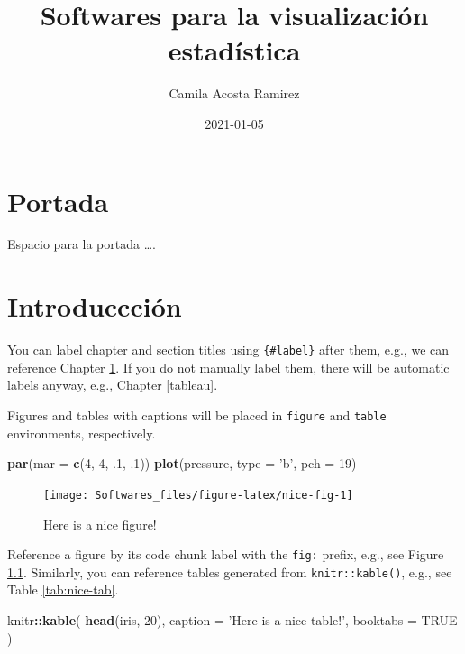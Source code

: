 \documentclass[
]{book}
\title{Softwares para la visualización estadística}
\author{Camila Acosta Ramirez}
\date{2021-01-05}
\newenvironment{Shaded}{\begin{snugshade}}{\end{snugshade}}
\newcommand{\DataTypeTok}[1]{\textcolor[rgb]{0.13,0.29,0.53}{#1}}
\newcommand{\DecValTok}[1]{\textcolor[rgb]{0.00,0.00,0.81}{#1}}
\newcommand{\FloatTok}[1]{\textcolor[rgb]{0.00,0.00,0.81}{#1}}
\newcommand{\KeywordTok}[1]{\textcolor[rgb]{0.13,0.29,0.53}{\textbf{#1}}}
\newcommand{\NormalTok}[1]{#1}
\newcommand{\OperatorTok}[1]{\textcolor[rgb]{0.81,0.36,0.00}{\textbf{#1}}}
\newcommand{\OtherTok}[1]{\textcolor[rgb]{0.56,0.35,0.01}{#1}}
\newcommand{\StringTok}[1]{\textcolor[rgb]{0.31,0.60,0.02}{#1}}
\begin{document}
\maketitle

{
\setcounter{tocdepth}{1}
\tableofcontents
}
\hypertarget{portada}{%
\chapter*{Portada}\label{portada}}

Espacio para la portada \ldots.

\hypertarget{intro}{%
\chapter{Introduccción}\label{intro}}

You can label chapter and section titles using \texttt{\{\#label\}} after them, e.g., we can reference Chapter \ref{intro}. If you do not manually label them, there will be automatic labels anyway, e.g., Chapter \ref{tableau}.

Figures and tables with captions will be placed in \texttt{figure} and \texttt{table} environments, respectively.

\begin{Shaded}
\begin{Highlighting}[]
\KeywordTok{par}\NormalTok{(}\DataTypeTok{mar =} \KeywordTok{c}\NormalTok{(}\DecValTok{4}\NormalTok{, }\DecValTok{4}\NormalTok{, }\FloatTok{.1}\NormalTok{, }\FloatTok{.1}\NormalTok{))}
\KeywordTok{plot}\NormalTok{(pressure, }\DataTypeTok{type =} \StringTok{'b'}\NormalTok{, }\DataTypeTok{pch =} \DecValTok{19}\NormalTok{)}
\end{Highlighting}
\end{Shaded}

\begin{figure}

{\centering \texttt{[image: Softwares\_files/figure-latex/nice-fig-1]} 

}

\caption{Here is a nice figure!}\label{fig:nice-fig}
\end{figure}

Reference a figure by its code chunk label with the \texttt{fig:} prefix, e.g., see Figure \ref{fig:nice-fig}. Similarly, you can reference tables generated from \texttt{knitr::kable()}, e.g., see Table \ref{tab:nice-tab}.

\begin{Shaded}
\begin{Highlighting}[]
\NormalTok{knitr}\OperatorTok{::}\KeywordTok{kable}\NormalTok{(}
  \KeywordTok{head}\NormalTok{(iris, }\DecValTok{20}\NormalTok{), }\DataTypeTok{caption =} \StringTok{'Here is a nice table!'}\NormalTok{,}
  \DataTypeTok{booktabs =} \OtherTok{TRUE}
\NormalTok{)}
\end{Highlighting}
\end{Shaded}
\end{document}
